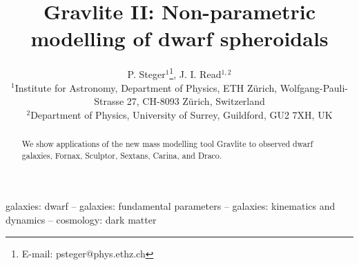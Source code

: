 \documentclass[useAMS,usenatbib]{mn2e}
\title[{\sc Gravlite II}: Mass modelling of dSph]{{\sc Gravlite II}:
  Non-parametric modelling of dwarf spheroidals}
\author[Steger]{P. Steger$^1$\thanks{E-mail: psteger@phys.ethz.ch}, J. I. Read$^{1,2}$\\
$^1$Institute for Astronomy, Department of Physics, ETH Z\"urich, Wolfgang-Pauli-Strasse 27, CH-8093 Z\"urich, Switzerland\\
$^2$Department of Physics, University of Surrey, Guildford, GU2 7XH, UK
}
\begin{document}
\maketitle

\begin{abstract}
    We show applications of the new mass modelling tool Gravlite to
    observed dwarf galaxies, Fornax, Sculptor, Sextans, Carina, and Draco.
\end{abstract}

\begin{keywords} galaxies: dwarf -- galaxies: fundamental parameters
    -- galaxies: kinematics and dynamics -- cosmology: dark matter
\end{keywords}











\end{document}

